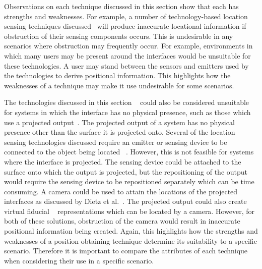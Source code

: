 \documentclass{bmcart}
\begin{document}
Observations on each technique discussed in this section show that each has strengths and weaknesses.
For example, a number of technology-based location sensing techniques discussed~\cite{Bose1990,Lee2004,Kortuem2005,Ni2004} will produce inaccurate locational information if obstruction of their sensing components occurs.
This is undesirable in any scenarios where obstruction may frequently occur.
For example, environments in which many users may be present around the interfaces would be unsuitable for these technologies.
A user may stand between the sensors and emitters used by the technologies to derive positional information.
This highlights how the weaknesses of a technique may make it use undesirable for some scenarios.

The technologies discussed in this section ~\cite{Bose1990,Lee2004,Kortuem2005,Ni2004} could also be considered unsuitable for systems in which the interface has no physical presence, such as those which use a projected output~\cite{Dietz2004,Jones2011}.
The projected output of a system has no physical presence other than the surface it is projected onto.
Several of the location sensing technologies discussed require an emitter or sensing device to be connected to the object being located ~\cite{Lee2004,Kortuem2005,Ni2004}.
However, this is not feasible for systems where the interface is projected.
The sensing device could be attached to the surface onto which the output is projected, but the repositioning of the output would require the sensing device to be repositioned separately which can be time consuming.
A camera could be used to attain the locations of the projected interfaces as discussed by Dietz et al.~\cite{Dietz2004}.
The projected output could also create virtual fiducial ~\cite{Bose1990} representations which can be located by a camera.
However, for both of these solutions, obstruction of the camera would result in inaccurate positional information being created.
Again, this highlights how the strengths and weaknesses of a position obtaining technique determine its suitability to a specific scenario.
Therefore it is important to compare the attributes of each technique when considering their use in a specific scenario.


\end{document}
